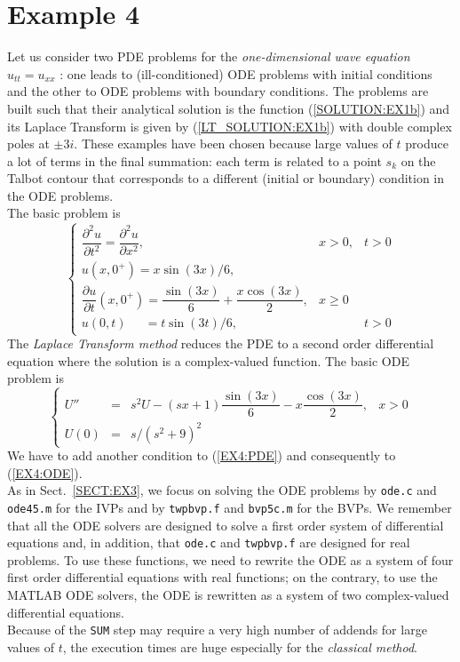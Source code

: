\documentclass[a4paper,10pt]{report}%
\begin{document}
\section{Example 4}\label{SECT:EX4}
Let us consider two PDE problems for the {\em one-dimensional wave equation} $u_{tt} = u_{xx}$
\cite{SCHIFF:1999}: one leads to (ill-conditioned) ODE problems with initial conditions and the other to ODE
problems with boundary conditions.
The problems are built such that their analytical solution is the function (\ref{SOLUTION:EX1b}) and its
Laplace Transform is given by (\ref{LT_SOLUTION:EX1b}) with double complex poles at $\pm 3i$.
These examples have been chosen because large values of $t$ produce a lot of terms in the final summation:
each term is related to a point $s_k$ on the Talbot contour that corresponds to a different (initial or
boundary) condition in the ODE problems.
\\
The basic problem is
\begin{equation}\label{EX4:PDE}
\left\{\begin{array}{lll}
\dfrac{\partial^2 u}{\partial t^2} = \dfrac{\partial^2 u}{\partial x^2},            & x>0, & t>0 \\[8pt]
u(x,0^+) = x\sin(3x)/6, \\[4pt]
\dfrac{\partial u}{\partial t}(x,0^+) = \dfrac{\sin(3x)}{6} + \dfrac{x\cos(3x)}{2}, & x\ge 0   \\[8pt]
u(0,t)\phantom{_{tt+}} = t\sin(3t)/6,                  && t > 0
\end{array}\right.
\end{equation}
The {\em Laplace Transform method} reduces the PDE to a second order differential equation where the solution is a complex-valued function. The basic ODE problem is
\begin{equation}\label{EX4:ODE}
\left\{\begin{array}{lcll}
 U'' &=& s^2 U - (sx+1)\dfrac{\sin(3x)}{6} - x\dfrac{\cos(3x)}{2},  & x>0 \\[8pt]
U(0) &=& s/(s^2 + 9)^2
\end{array}\right.
\end{equation}
We have to add another condition to (\ref{EX4:PDE}) and consequently to (\ref{EX4:ODE}).
\\
As in Sect.~\ref{SECT:EX3}, we focus on solving the ODE problems by {\tt ode.c} and {\tt ode45.m} for the IVPs and by {\tt twpbvp.f} and {\tt bvp5c.m} for the BVPs.
We remember that all the ODE solvers are designed to solve a first order system of differential equations
and, in addition, that {\tt ode.c} and {\tt twpbvp.f} are designed for real problems. To use these functions,
we need to rewrite the ODE as a system of four first order differential equations with real functions; on the
contrary, to use the MATLAB ODE solvers, the ODE is rewritten as a system of two complex-valued differential
equations.
\\
Because of the {\tt SUM} step may require a very high number of addends for large values of $t$, the
execution times are huge especially for the {\em classical method}.
\end{document}
